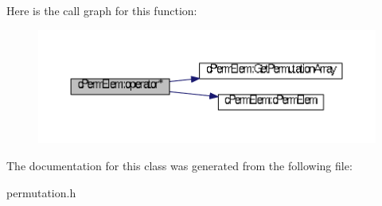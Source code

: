 \-Here is the call graph for this function\-:
\nopagebreak
\begin{figure}[H]
\begin{center}
\leavevmode
\includegraphics[width=350pt]{classcPermElem_a19da6e521f8adf3d252250f3836c563e_cgraph}
\end{center}
\end{figure}




\-The documentation for this class was generated from the following file\-:\begin{DoxyCompactItemize}
\item 
permutation.\-h\end{DoxyCompactItemize}
